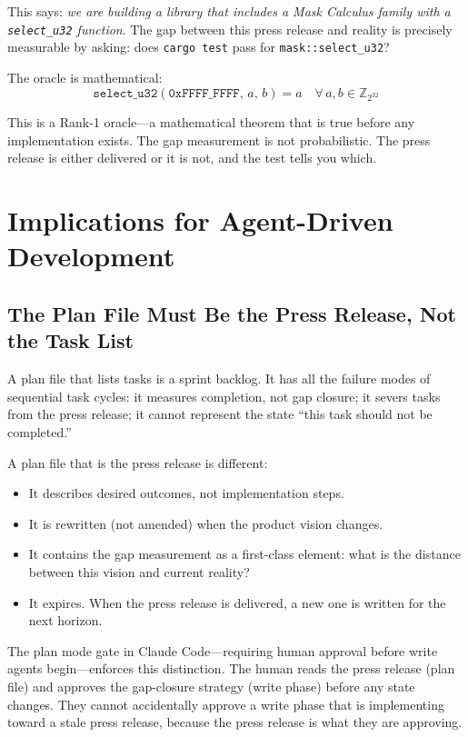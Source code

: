 \documentclass[11pt,a4paper]{article}
\newcommand{\code}[1]{\texttt{#1}}
\begin{document}
This says: \emph{we are building a library that includes a Mask Calculus family
with a \code{select\_u32} function}.  The gap between this press release and
reality is precisely measurable by asking: does \code{cargo test} pass for
\code{mask::select\_u32}?

The oracle is mathematical:
\[
  \texttt{select\_u32}(\texttt{0xFFFF\_FFFF},\, a,\, b) = a
  \quad \forall\, a, b \in \mathbb{Z}_{2^{32}}
\]

This is a Rank-1 oracle---a mathematical theorem that is true before any
implementation exists.  The gap measurement is not probabilistic.  The press
release is either delivered or it is not, and the test tells you which.

\section{Implications for Agent-Driven Development}

\subsection{The Plan File Must Be the Press Release, Not the Task List}

A plan file that lists tasks is a sprint backlog.  It has all the failure modes
of sequential task cycles: it measures completion, not gap closure; it severs
tasks from the press release; it cannot represent the state ``this task should
not be completed.''

A plan file that is the press release is different:
\begin{itemize}
  \item It describes desired outcomes, not implementation steps.
  \item It is rewritten (not amended) when the product vision changes.
  \item It contains the gap measurement as a first-class element: what is
    the distance between this vision and current reality?
  \item It expires.  When the press release is delivered, a new one is written
    for the next horizon.
\end{itemize}

The plan mode gate in Claude Code---requiring human approval before write
agents begin---enforces this distinction.  The human reads the press release
(plan file) and approves the gap-closure strategy (write phase) before any
state changes.  They cannot accidentally approve a write phase that is
implementing toward a stale press release, because the press release is what
they are approving.
\end{document}
